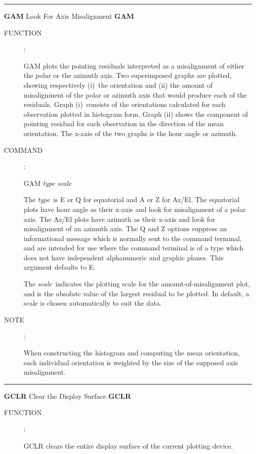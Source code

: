 
\goodbreak
\rule{\textwidth}{0.3mm}
{\Large {\bf GAM} \hfill Look For Axis Misalignment
\hfill {\bf GAM}}
\begin{description}
\item [FUNCTION]:

GAM plots the pointing residuals interpreted as a misalignment
of either the polar or the azimuth axis.  Two superimposed graphs
are plotted, showing respectively (i)~the orientation and (ii) the
amount of misalignment of the polar or azimuth axis that would
produce each of the residuals.  Graph (i)~consists of the orientations
calculated for each observation plotted in histogram form.  Graph (ii)
shows the component of pointing residual for each observation in the
direction of the mean orientation.  The x-axis of the two graphs is
the hour angle or azimuth.

\item [COMMAND]:

\begin{cmd}
\> \> GAM {\it type scale}
\end{cmd}

The {\it type}\, is E or Q for equatorial and A or Z
for Az/El.  The equatorial
plots have hour angle as their x-axis and look for misalignment of a
polar axis.  The Az/El plots have azimuth as their x-axis and look
for misalignment of an azimuth axis.  The Q and Z options
suppress an informational message which is normally sent to
the command terminal, and are intended for use where the
command terminal is of a type which does not have independent
alphanumeric and graphic planes.  This argument defaults to E.

The {\it scale}\, indicates the plotting scale for the
amount-of-misalignment plot, and is the absolute value of the
largest residual to be plotted.  In default, a scale is chosen
automatically to suit the data.

\item [NOTE]:

When constructing the histogram and computing the mean orientation,
each individual orientation is weighted by the size of the
supposed axis misalignment.

\end{description}


\goodbreak
\rule{\textwidth}{0.3mm}
{\Large {\bf GCLR} \hfill Clear the Display Surface \hfill {\bf GCLR}}
\begin{description}
\item [FUNCTION]:

GCLR clears the entire display surface of the
current plotting device.

\end{description}


